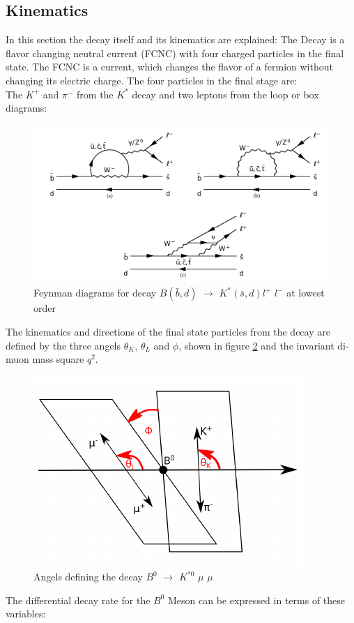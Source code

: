 \documentclass[english]{uzhpub}
\begin{document}
\subsection{Kinematics} \label{sec:Kinematics}
In this section the decay itself and its kinematics are explained:
The Decay is a flavor changing neutral current (FCNC) with four charged particles in the final state. The FCNC is a current, which changes the flavor of a fermion without changing its electric charge. The four particles in the final stage are:  \\
The $K^+$ and $\pi^-$ from the $K^{*}$ decay and two leptons from the loop or box diagrams:
\begin{figure}[H]
 \centering
 \includegraphics[width=0.8\linewidth]{KstarFeynman}
 \caption{Feynman diagrams for decay $B(\bar{b},d)$ $\rightarrow$ $ K^*(\bar{s},d) l^+$ $l^-$ at lowest order}
 \label{fig:Feynman}
\end{figure}
The kinematics and directions of the final state particles from the decay are defined by the three angels $\theta_K$, $\theta_L$ and $\phi$, shown in figure \ref{fig:angels} and the invariant di-muon mass square $q^2$.
\begin{figure}[H]
 \centering
 \includegraphics[width=0.6\linewidth]{angels}
 \caption{Angels defining the decay $B^0$ $\rightarrow$ $K^{*0}$ $\mu$ $\mu$}
 \label{fig:angels}
\end{figure}
The differential decay rate for the $B^0$ Meson can be expressed in terms of these variables:
\end{document}
